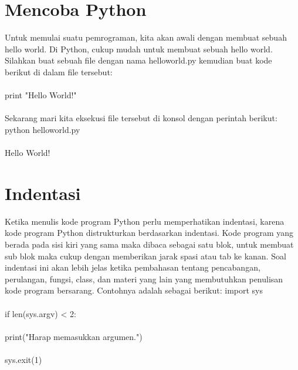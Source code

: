 \documentclass{article}
\begin{document}
\section{Mencoba Python}
Untuk memulai suatu pemrograman, kita akan awali dengan membuat sebuah hello world. Di Python, cukup mudah untuk membuat sebuah hello world. Silahkan buat sebuah file dengan nama helloworld.py kemudian buat kode berikut di dalam file tersebut:
\paragraph{}
print "Hello World!"
\paragraph{}
Sekarang mari kita eksekusi file tersebut di konsol dengan perintah berikut:
python helloworld.py
\paragraph{}
Hello World!

\section{Indentasi}
Ketika menulis kode program Python perlu memperhatikan indentasi, karena kode program Python distrukturkan berdasarkan indentasi. Kode program yang berada pada sisi kiri yang sama maka dibaca sebagai satu blok, untuk membuat sub blok maka cukup dengan memberikan jarak spasi atau tab ke kanan.
Soal indentasi ini akan lebih jelas ketika pembahasan tentang pencabangan, perulangan, fungsi, class, dan materi yang lain yang membutuhkan penulisan kode program bersarang.
Contohnya adalah sebagai berikut:
import sys
\paragraph{}
if len(sys.argv) < 2:
\paragraph{}
    print("Harap memasukkan argumen.")
    \paragraph{}
    sys.exit(1)
    
\end{document}
